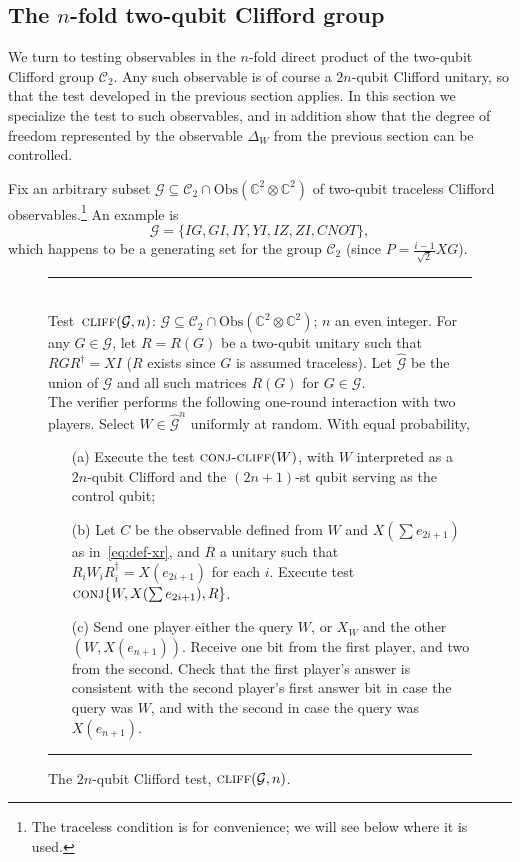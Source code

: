 \documentclass[11pt]{article}
\theoremstyle{remark}
\theoremstyle{definition}
\newcommand{\C}{\ensuremath{\mathbb{C}}}
\newcommand{\setft}[1]{\mathrm{#1}}
\newcommand{\Obs}{\setft{Obs}}
\newcommand{\pbt}{\textsc{pbt}}
\newcommand{\conj}{\textsc{conj}}
\newcommand{\perm}{\textsc{tens}}
\newcommand{\conjc}{\textsc{conj-cliff}}
\newcommand{\cliff}{\textsc{cliff}}
\newcommand{\cliffordgb}{{\mathcal{C}_2}}
\begin{document}
\subsection{The $n$-fold two-qubit Clifford group}
\label{sec:n-2-clifford}

We turn to testing observables in the $n$-fold direct product of the two-qubit Clifford group $\cliffordgb$. Any such observable is of course a $2n$-qubit Clifford unitary, so that the test developed in the previous section applies. In this section we specialize the test to such observables, and in addition show that the degree of freedom represented by the observable $\Delta_W$ from the previous section can be controlled. 

 Fix an arbitrary subset $\mathcal{G} \subseteq \cliffordgb \cap \Obs(\C^2\otimes \C^2)$ of two-qubit traceless Clifford observables.\footnote{The traceless condition is for convenience; we will see below where it is used.} An example is 
$$\mathcal{G} = \{IG,GI,IY,YI,IZ,ZI,CNOT\},$$
 which happens to be a generating set for the group $\cliffordgb$ (since $P = \frac{i-1}{\sqrt{2}} XG$).
 
\begin{figure}[H]
\rule[1ex]{\textwidth}{0.5pt}\\
Test~$\cliff(\mathcal{G},n)$: $\mathcal{G} \subseteq \cliffordgb \cap \Obs(\C^2\otimes \C^2)$; $n$ an even integer.  For any $G\in \mathcal{G}$, let $R=R(G)$ be a two-qubit unitary such that $RGR^\dagger = XI$ ($R$ exists since $G$ is assumed traceless). Let $\hat{\mathcal{G}}$ be the union of $\mathcal{G}$ and all such matrices $R(G)$ for $G\in\mathcal{G}$.\\
The verifier performs the following one-round interaction with two
players. Select $W \in \hat{\mathcal{G}}^n$ uniformly at random. With equal probability,
\begin{enumerate}
\item[(a)] Execute the test $\conjc(W)$, with $W$ interpreted as a $2n$-qubit Clifford and the $(2n+1)$-st qubit serving as the control qubit; 
\item[(b)] Let $C$ be the observable defined from $W$ and $X(\sum e_{2i+1})$ as in~\eqref{eq:def-xr}, and $R$ a unitary such that $R_i W_i R_i^\dagger = X(e_{2i+1})$ for each $i$.
Execute test $\conj\{W, X(\sum e_{2i+1}), R\}$. 
\item[(c)] Send one player either the query $W$, or $X_W$ and the other $(W,X(e_{n+1}))$. Receive one bit from the first player, and two from the second. Check that the first player's answer is consistent with the second player's first answer bit in case the query was $W$, and with the second in case the query was $X(e_{n+1})$. 
\end{enumerate}
\rule[2ex]{\textwidth}{0.5pt}\vspace{-1cm}
\caption{The $2n$-qubit Clifford test, $\cliff(\mathcal{G},n)$.}
\label{fig:clifford-test-3}
\end{figure}
\end{document}
